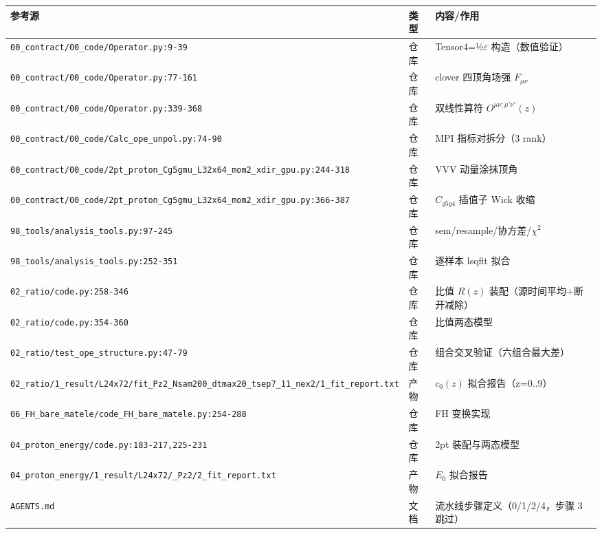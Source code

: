 \documentclass[UTF8]{ctexart}
\begin{document}
\begin{xltabular}{\textwidth}{XlX}
\toprule
\textcolor{evidence}{参考源} & 类型 & 内容/作用 \\
\midrule
\endhead
\texttt{\nolinkurl{00_contract/00_code/Operator.py:9-39}} & 仓库 & Tensor4=½$\varepsilon$ 构造（数值验证） \\
\texttt{\nolinkurl{00_contract/00_code/Operator.py:77-161}} & 仓库 & clover 四顶角场强 $F_{\mu\nu}$ \\
\texttt{\nolinkurl{00_contract/00_code/Operator.py:339-368}} & 仓库 & 双线性算符 $O^{\mu\nu;\mu'\nu'}(z)$ \\
\texttt{\nolinkurl{00_contract/00_code/Calc_ope_unpol.py:74-90}} & 仓库 & MPI 指标对拆分（3 rank） \\
\texttt{\nolinkurl{00_contract/00_code/2pt_proton_Cg5gmu_L32x64_mom2_xdir_gpu.py:244-318}} & 仓库 & VVV 动量涂抹顶角 \\
\texttt{\nolinkurl{00_contract/00_code/2pt_proton_Cg5gmu_L32x64_mom2_xdir_gpu.py:366-387}} & 仓库 & $C_{g5g4}$ 插值子 Wick 收缩 \\
\texttt{\nolinkurl{98_tools/analysis_tools.py:97-245}} & 仓库 & sem/resample/协方差/$\chi^2$ \\
\texttt{\nolinkurl{98_tools/analysis_tools.py:252-351}} & 仓库 & 逐样本 lsqfit 拟合 \\
\texttt{\nolinkurl{02_ratio/code.py:258-346}} & 仓库 & 比值 $R(z)$ 装配（源时间平均+断开减除） \\
\texttt{\nolinkurl{02_ratio/code.py:354-360}} & 仓库 & 比值两态模型 \\
\texttt{\nolinkurl{02_ratio/test_ope_structure.py:47-79}} & 仓库 & 组合交叉验证（六组合最大差） \\
\texttt{\nolinkurl{02_ratio/1_result/L24x72/fit_Pz2_Nsam200_dtmax20_tsep7_11_nex2/1_fit_report.txt}} & 产物 & $c_0(z)$ 拟合报告（z=0..9） \\
\texttt{\nolinkurl{06_FH_bare_matele/code_FH_bare_matele.py:254-288}} & 仓库 & FH 变换实现 \\
\texttt{\nolinkurl{04_proton_energy/code.py:183-217,225-231}} & 仓库 & 2pt 装配与两态模型 \\
\texttt{\nolinkurl{04_proton_energy/1_result/L24x72/_Pz2/2_fit_report.txt}} & 产物 & $E_0$ 拟合报告 \\
\texttt{\nolinkurl{AGENTS.md}} & 文档 & 流水线步骤定义（0/1/2/4，步骤 3 跳过） \\
\bottomrule
\end{xltabular}

\end{document}
